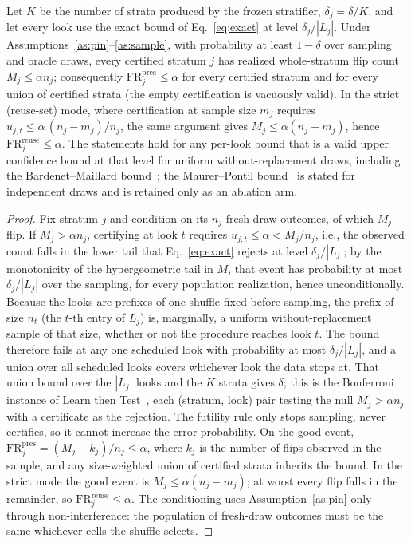 \begin{theorem}\label{thm:valid}
Let $K$ be the number of strata produced by the frozen stratifier,
$\delta_j = \delta/K$, and let every look use the exact bound of
Eq.~\eqref{eq:exact} at level $\delta_j/|L_j|$. Under
Assumptions~\ref{as:pin}--\ref{as:sample}, with probability at least
$1-\delta$ over sampling and oracle draws, every certified stratum $j$
has realized whole-stratum flip count $M_j \le \alpha n_j$;
consequently $\mathrm{FR}^{\mathrm{pres}}_j \le \alpha$ for every
certified stratum and for every union of certified strata (the empty
certification is vacuously valid). In the strict (reuse-set) mode, where
certification at sample size $m_j$ requires
$u_{j,t} \le \alpha\,(n_j{-}m_j)/n_j$, the same argument gives
$M_j \le \alpha (n_j - m_j)$, hence
$\mathrm{FR}^{\mathrm{reuse}}_j \le \alpha$. The statements hold for any
per-look bound that is a valid upper confidence bound at that level for
uniform without-replacement draws, including the Bardenet--Maillard
bound~\cite{bardenet}; the Maurer--Pontil bound~\cite{maurer} is stated
for independent draws and is retained only as an ablation arm.
\end{theorem}
\begin{proof}
Fix stratum $j$ and condition on its $n_j$ fresh-draw outcomes, of
which $M_j$ flip. If $M_j > \alpha n_j$, certifying at look $t$ requires
$u_{j,t} \le \alpha < M_j/n_j$, i.e., the observed count falls in the
lower tail that Eq.~\eqref{eq:exact} rejects at level $\delta_j/|L_j|$;
by the monotonicity of the hypergeometric tail in $M$, that event has
probability at most $\delta_j/|L_j|$ over the sampling, for every
population realization, hence unconditionally. Because the looks are
prefixes of one shuffle fixed before sampling, the prefix of size $n_t$
(the $t$-th entry of $L_j$) is, marginally, a uniform
without-replacement sample of that size, whether or not the procedure
reaches look $t$. The bound therefore fails at any one scheduled look
with probability at most $\delta_j/|L_j|$, and a union over all
scheduled looks covers whichever look the data stops at. That
union bound over the
$|L_j|$ looks and the $K$ strata gives $\delta$; this is the Bonferroni
instance of Learn then Test~\cite{ltt}, each (stratum, look) pair
testing the null $M_j > \alpha n_j$ with a certificate as the
rejection. The futility rule only stops sampling, never certifies, so
it cannot increase the error probability. On the good event,
$\mathrm{FR}^{\mathrm{pres}}_j = (M_j - k_j)/n_j \le \alpha$, where $k_j$
is the number of flips observed in the sample, and any size-weighted union of
certified strata inherits the bound. In the strict mode the good event
is $M_j \le \alpha (n_j - m_j)$; at worst every flip falls in the
remainder, so $\mathrm{FR}^{\mathrm{reuse}}_j \le \alpha$. The
conditioning uses Assumption~\ref{as:pin} only through
non-interference: the population of fresh-draw outcomes must be the
same whichever cells the shuffle selects.
\end{proof}

